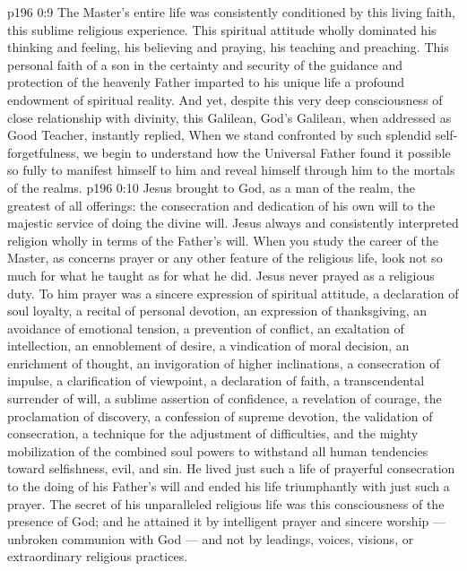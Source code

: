 \vs p196 0:9 The Master’s entire life was consistently conditioned by this living faith, this sublime religious experience. This spiritual attitude wholly dominated his thinking and feeling, his believing and praying, his teaching and preaching. This personal faith of a son in the certainty and security of the guidance and protection of the heavenly Father imparted to his unique life a profound endowment of spiritual reality. And yet, despite this very deep consciousness of close relationship with divinity, this Galilean, God’s Galilean, when addressed as Good Teacher, instantly replied,  When we stand confronted by such splendid self\hyp{}forgetfulness, we begin to understand how the Universal Father found it possible so fully to manifest himself to him and reveal himself through him to the mortals of the realms.
\vs p196 0:10 Jesus brought to God, as a man of the realm, the greatest of all offerings: the consecration and dedication of his own will to the majestic service of doing the divine will. Jesus always and consistently interpreted religion wholly in terms of the Father’s will. When you study the career of the Master, as concerns prayer or any other feature of the religious life, look not so much for what he taught as for what he did. Jesus never prayed as a religious duty. To him prayer was a sincere expression of spiritual attitude, a declaration of soul loyalty, a recital of personal devotion, an expression of thanksgiving, an avoidance of emotional tension, a prevention of conflict, an exaltation of intellection, an ennoblement of desire, a vindication of moral decision, an enrichment of thought, an invigoration of higher inclinations, a consecration of impulse, a clarification of viewpoint, a declaration of faith, a transcendental surrender of will, a sublime assertion of confidence, a revelation of courage, the proclamation of discovery, a confession of supreme devotion, the validation of consecration, a technique for the adjustment of difficulties, and the mighty mobilization of the combined soul powers to withstand all human tendencies toward selfishness, evil, and sin. He lived just such a life of prayerful consecration to the doing of his Father’s will and ended his life triumphantly with just such a prayer. The secret of his unparalleled religious life was this consciousness of the presence of God; and he attained it by intelligent prayer and sincere worship --- unbroken communion with God --- and not by leadings, voices, visions, or extraordinary religious practices.
